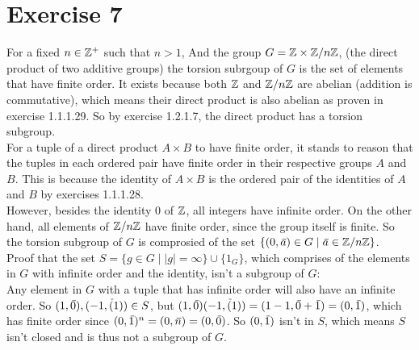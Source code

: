 \documentclass[12pt]{article}
\begin{document}
    \section*{Exercise 7}
    For a fixed $n \in \mathbb{Z}^+$ such that $n > 1$,
    And the group $G = \mathbb{Z} \times \mathbb{Z}/n\mathbb{Z}$,
    (the direct product of two additive groups)
    the torsion subrgoup of $G$ is the set of elements that have finite
    order.
    It exists because both $\mathbb{Z}$ and $\mathbb{Z}/n\mathbb{Z}$ are abelian
    (addition is commutative),
    which means their direct product is also abelian
    as proven in exercise 1.1.1.29.
    So by exercise 1.2.1.7, the direct product has a torsion subgroup. \\
    For a tuple of a direct product $A \times B$ to have finite order,
    it stands to reason that the tuples in each ordered pair have finite
    order in their respective groups $A$ and $B$.
    This is because the identity of $A \times B$ is the ordered
    pair of the identities of $A$ and $B$ by exercises 1.1.1.28. \\
    However, besides the identity 0 of $\mathbb{Z}$, all integers have infinite
    order.
    On the other hand, all elements of $\mathbb{Z}/n\mathbb{Z}$ have finite order,
    since the group itself is finite.
    So the torsion subgroup of $G$ is comprosied of the set
    $\{(0, \,\overline{\!{a}}) \in G \mid \,\overline{\!{a}} \in \mathbb{Z}/n\mathbb{Z} \}$. \\
    Proof that the set $S = \{g \in G \mid |g| = \infty\} \cup \{1_G\}$,
    which comprises of the elements in $G$ with infinite order 
    and the identity, isn't a subgroup of $G$: \\
    Any element in $G$ with a tuple that has infinite order
    will also have an infinite order.
    So $(1, \,\overline{\!{0}}), (-1, \,\overline{\!{(}}1)) \in S$,
    but $(1, \,\overline{\!{0}})(-1, \,\overline{\!{(}}1)) = (1 - 1, \,\overline{\!{0}} + \,\overline{\!{1}})
    = (0, \,\overline{\!{1}})$,
    which has finite order
    since $(0, \,\overline{\!{1}})^n = (0, \,\overline{\!{n}}) = (0, \,\overline{\!{0}})$.
    So $(0, \,\overline{\!{1}})$ isn't in $S$,
    which means $S$ isn't closed
    and is thus not a subgroup of $G$.
\end{document}
